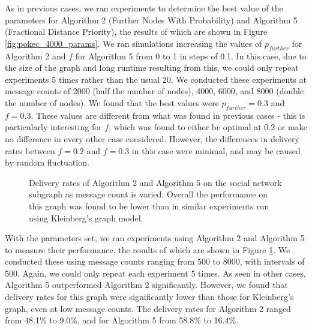 \documentclass[bsc,frontabs,twoside,singlespacing,parskip,deptreport]{infthesis}     %
\begin{document}
As in previous cases, we ran experiments to determine the best value of the parameters for Algorithm 2 (Further Nodes With Probability) and Algorithm 5 (Fractional Distance Priority), the results of which are shown in Figure \ref{fig:pokec_4000_params}. We ran simulations increasing the values of $p_{further}$ for Algorithm 2 and $f$ for Algorithm 5 from 0 to 1 in steps of 0.1. In this case, due to the size of the graph and long runtime resulting from this, we could only repeat experiments 5 times rather than the usual 20. We conducted these experiments at message counts of 2000 (half the number of nodes), 4000, 6000, and 8000 (double the number of nodes). We found that the best values were $p_{further}=0.3$ and $f=0.3$. These values are different from what was found in previous cases - this is particularly interesting for $f$, which was found to either be optimal at 0.2 or make no difference in every other case considered. However, the differences in delivery rates between $f=0.2$ and $f=0.3$ in this case were minimal, and may be caused by random fluctuation.

\begin{figure}
\centering
{}
\caption{Delivery rates of Algorithm 2 and Algorithm 5 on the social network subgraph as message count is varied. Overall the performance on this graph was found to be lower than in similar experiments run using Kleinberg's graph model.}
\label{fig:pokec_4000_results}
\end{figure}

With the parameters set, we ran experiments using Algorithm 2 and Algorithm 5 to measure their performance, the results of which are shown in Figure \ref{fig:pokec_4000_results}. We conducted these using message counts ranging from 500 to 8000, with intervals of 500. Again, we could only repeat each experiment 5 times. As seen in other cases, Algorithm 5 outperformed Algorithm 2 significantly. However, we found that delivery rates for this graph were significantly lower than those for Kleinberg's graph, even at low message counts. The delivery rates for Algorithm 2 ranged from 48.1\% to 9.0\%, and for Algorithm 5 from 58.8\% to 16.4\%.
\end{document}
